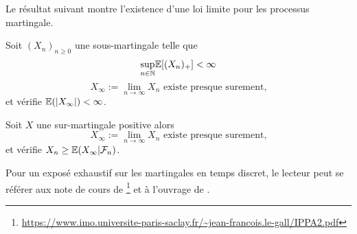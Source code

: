 Le résultat suivant montre l'existence d'une loi limite pour les processus martingale.
\begin{theo}
Soit $(X_n)_{n\geq0}$ une sous-martingale telle que 
$$
\underset{n\in\mathbb{N}}{\sup}\mathbb{E}[(X_n)_+]<\infty
$$ 
$$
X_\infty := \underset{n\rightarrow\infty}{\lim} X_n\text{ existe presque surement,}
$$
et vérifie $\mathbb{E}(|X_\infty|)<\infty$.
\end{theo}
\begin{coro}
Soit $X$ une sur-martingale positive alors 
$$
X_\infty := \underset{n\rightarrow\infty}{\lim} X_n\text{ existe presque surement,}
$$
et vérifie $X_n \geq  \mathbb{E}(X_\infty|\mathcal{F}_n)$.
\end{coro}
Pour un exposé exhaustif sur les martingales en temps discret, le lecteur peut se référer aux note de cours de \citet[Chapitre 13]{LeGall2006} \footnote{\url{https://www.imo.universite-paris-saclay.fr/~jean-francois.le-gall/IPPA2.pdf}} et à l'ouvrage de \citet{Williams1991}.

